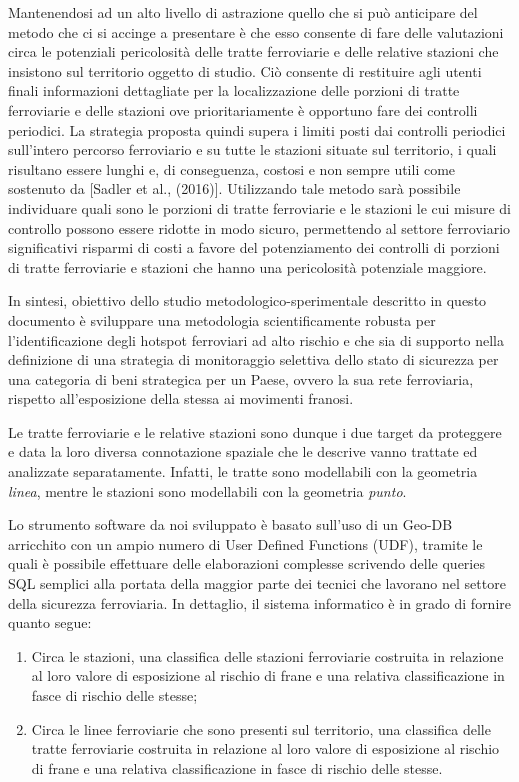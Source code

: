 Mantenendosi ad un alto livello di astrazione quello che si può anticipare del metodo che ci si accinge a presentare è che esso consente di fare delle valutazioni circa le potenziali pericolosità delle tratte ferroviarie e delle relative stazioni che insistono sul territorio oggetto di studio. Ciò consente di restituire agli utenti finali informazioni dettagliate per la localizzazione delle porzioni di tratte ferroviarie e delle stazioni ove prioritariamente è opportuno fare dei controlli periodici.
La strategia proposta quindi supera i limiti posti dai controlli periodici sull'intero percorso ferroviario e su tutte le stazioni situate sul territorio, i quali risultano essere lunghi e, di conseguenza, costosi e non sempre utili come sostenuto da [Sadler et al., (2016)]. Utilizzando tale metodo sarà possibile individuare quali sono le porzioni di tratte ferroviarie e le stazioni le cui misure di controllo possono essere ridotte in modo sicuro, permettendo al settore ferroviario significativi risparmi di costi a favore del potenziamento dei controlli di porzioni di tratte ferroviarie e stazioni che hanno una pericolosità potenziale maggiore.\newline

In sintesi, obiettivo dello studio metodologico-sperimentale descritto in questo documento è sviluppare una metodologia scientificamente robusta per l’identificazione degli hotspot ferroviari ad alto rischio e che sia di supporto nella definizione di una strategia di monitoraggio selettiva dello stato di sicurezza per una categoria di beni strategica per un Paese, ovvero la sua rete ferroviaria, rispetto all'esposizione della stessa ai movimenti franosi.\newline

Le tratte ferroviarie e le relative stazioni sono dunque i due target da proteggere e data la loro diversa connotazione spaziale che le descrive vanno trattate ed analizzate separatamente. Infatti, le tratte sono modellabili con la geometria \textit{linea}, mentre le stazioni sono modellabili con la geometria \textit{punto}.\newline

Lo strumento software da noi sviluppato è basato sull'uso di un Geo-DB arricchito con un ampio numero di User Defined Functions (UDF), tramite le quali è possibile effettuare delle elaborazioni complesse scrivendo delle queries SQL semplici alla portata della maggior parte dei tecnici che lavorano nel settore della sicurezza ferroviaria. In dettaglio, il sistema informatico è in grado di fornire quanto segue:
\begin{enumerate}
\item Circa le stazioni, una classifica delle stazioni ferroviarie costruita in relazione al loro valore di esposizione al rischio di frane e una relativa classificazione in fasce di rischio delle stesse;
\item Circa le linee ferroviarie che sono presenti sul territorio, una classifica delle tratte ferroviarie costruita in relazione al loro valore di esposizione al rischio di frane e una relativa classificazione in fasce di rischio delle stesse.
\end{enumerate}


